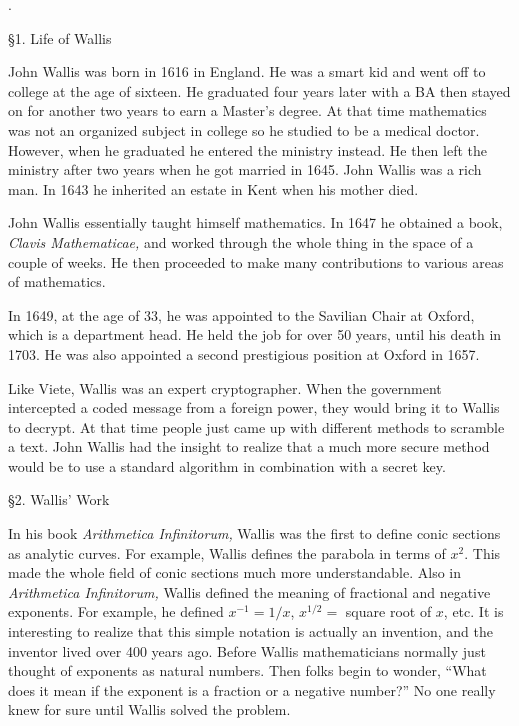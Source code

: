 .


\item{\S1.} Life of Wallis

 John Wallis was born in 1616 in England.
He was a smart kid and went off to college at the age of sixteen.
He graduated four years later with a BA then stayed on for another
two years to earn a Master's degree.
At that time mathematics was not an organized subject in
college so he studied to be a medical doctor.
However, when he graduated he entered the ministry instead.
He then left the ministry after two years when he got married
in 1645.
John Wallis was a rich man. In 1643 he inherited an
estate in Kent when his mother died.

 John Wallis essentially taught himself
mathematics.
In 1647 he obtained a book, {\it Clavis Mathematicae,} and worked
through the whole thing in the space of a couple of weeks.
He then proceeded to make many contributions to various
areas of mathematics.

In 1649, at the age of 33, he was appointed to the Savilian Chair
at Oxford,
which is a department head.
He held the job for over 50 years, until his death in 1703.
He was also appointed a second prestigious position
at Oxford in 1657.

Like Viete, Wallis was an expert cryptographer.
When the government intercepted a coded message from a foreign power,
they would bring it to Wallis to decrypt.
At that time people just came up with different methods to scramble
a text.
John Wallis had the insight to realize that a much more secure
method would be to use a standard algorithm in combination with a
secret key.

\item{\S2.} Wallis' Work

 In his book {\it Arithmetica Infinitorum,}
Wallis was the first to define conic sections as analytic curves.
For example, Wallis defines the parabola in terms of $x^2$.
This made the whole field of conic sections much more understandable.
Also in {\it Arithmetica Infinitorum,} Wallis defined
the meaning of fractional and negative exponents.
For example, he defined $x^{-1}=1/x$, $x^{1/2}=$ square root of $x$, etc.
It is interesting to realize that this simple notation is actually an invention,
and the inventor lived over 400 years ago.
Before Wallis mathematicians normally just thought of exponents as natural numbers.
Then folks begin to wonder, ``What does it mean if the exponent is a fraction or
a negative number?''
No one really knew for sure until Wallis
solved the problem.


